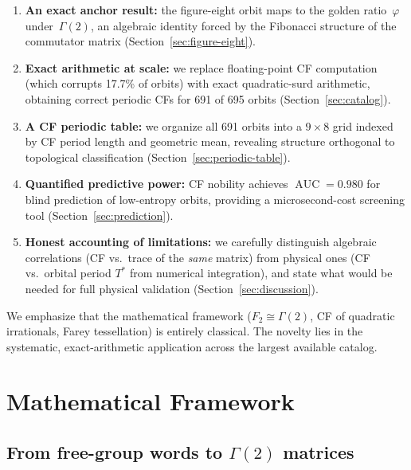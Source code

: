 \documentclass[11pt]{article}
\theoremstyle{definition}
\DeclareMathOperator{\AUC}{AUC}
\begin{document}
\begin{enumerate}
\item \textbf{An exact anchor result:} the figure-eight orbit maps
  to the golden ratio~$\varphi$ under~$\Gamma(2)$, an algebraic
  identity forced by the Fibonacci structure of the commutator
  matrix (Section~\ref{sec:figure-eight}).

\item \textbf{Exact arithmetic at scale:} we replace floating-point
  CF computation (which corrupts 17.7\% of orbits) with exact
  quadratic-surd arithmetic, obtaining correct periodic CFs for 691
  of 695 orbits (Section~\ref{sec:catalog}).

\item \textbf{A CF periodic table:} we organize all 691 orbits into
  a $9 \times 8$ grid indexed by CF period length and geometric
  mean, revealing structure orthogonal to topological classification
  (Section~\ref{sec:periodic-table}).

\item \textbf{Quantified predictive power:} CF nobility achieves
  $\AUC = 0.980$ for blind prediction of low-entropy orbits,
  providing a microsecond-cost screening tool
  (Section~\ref{sec:prediction}).

\item \textbf{Honest accounting of limitations:} we carefully
  distinguish algebraic correlations (CF vs.\ trace of the
  \emph{same} matrix) from physical ones (CF vs.\ orbital period
  $T^*$ from numerical integration), and state what would be needed
  for full physical validation (Section~\ref{sec:discussion}).
\end{enumerate}

We emphasize that the mathematical framework ($F_2 \cong \Gamma(2)$,
CF of quadratic irrationals, Farey tessellation) is entirely
classical. The novelty lies in the systematic, exact-arithmetic
application across the largest available catalog.


\section{Mathematical Framework}\label{sec:framework}

\subsection{From free-group words to $\Gamma(2)$ matrices}
\end{document}
